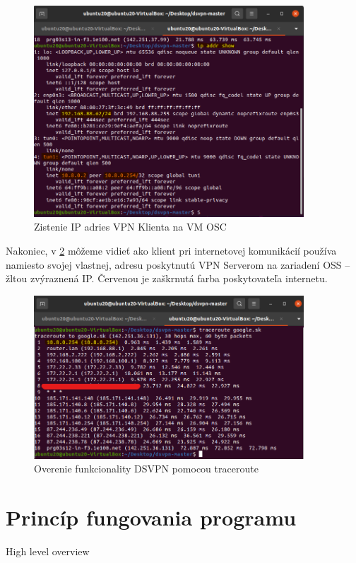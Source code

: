 \begin{figure}
	\centering
	\includegraphics[width=0.9\textwidth]{figures/ipu20}
	\caption{Zistenie IP adries VPN Klienta na VM OSC}
	\label{ipu20}
\end{figure}
Nakoniec, v \ref{vpntru20} môžeme vidieť ako klient pri internetovej komunikácií používa namiesto svojej vlastnej, adresu poskytnutú VPN Serverom na zariadení OSS -- žltou zvýraznená IP. Červenou je zaškrnutá farba poskytovateľa internetu. 

\begin{figure}
	\centering
	\includegraphics[width=0.9\textwidth]{figures/vpntru20}
	\caption{Overenie funkcionality DSVPN pomocou traceroute}
	\label{vpntru20}
\end{figure}
\section{Princíp fungovania programu}
High level overview

